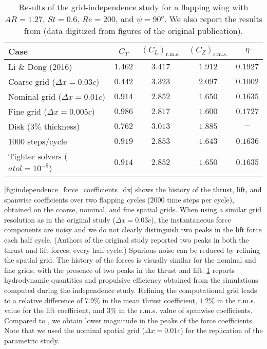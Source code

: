 \begin{table}[!h]
  \centering
  \begin{tabular}{lcccc}
    \hline\hline
    Case & $\overline{C_T}$ & $\left( C_L \right)_\text{r.m.s.}$ & $\left( C_Z \right)_\text{r.m.s.}$ & $\eta$ \\
    \hline
    Li \& Dong (2016) & $1.462$ & $3.417$ & $1.912$ & $0.1927$ \\
    Coarse grid ($\Delta x = 0.03c$) & $0.442$ & $3.323$ & $2.097$ & $0.1002$ \\
    Nominal grid ($\Delta x = 0.01c$) & $0.914$ & $2.852$ & $1.650$ & $0.1635$ \\
    Fine grid ($\Delta x = 0.005c$) & $0.986$ & $2.817$ & $1.600$ & $0.1727$ \\
    Disk ($3\%$ thickness) & $0.762$ & $3.013$ & $1.885$ & $-$ \\
    $1000$ steps/cycle & $0.919$ & $2.853$ & $1.643$ & $0.1636$ \\
    Tighter solvers ($atol = 10^{-9}$) & $0.914$ & $2.852$ & $1.650$ & $0.1635$ \\
    \hline\hline
  \end{tabular}
  \caption{Results of the grid-independence study for a flapping wing with $AR = 1.27$, $St = 0.6$, $Re = 200$, and $\psi = 90^o$. We also report the results from \citet{li_dong_2016} (data digitized from figures of the original publication).}
  \label{tab:independence_results}
\end{table}

\cref{fig:independence_force_coefficients_dx} shows the history of the thrust, lift, and spanwise coefficients over two flapping cycles ($2000$ time steps per cycle), obtained on the coarse, nominal, and fine spatial grids.
When using a similar grid resolution as in the original study ($\Delta x = 0.03c$), the instantaneous force components are noisy and we do not clearly distinguish two peaks in the lift force each half cycle.
(Authors of the original study reported two peaks in both the thrust and lift forces, every half cycle.)
Spurious noise can be reduced by refining the spatial grid.
The history of the forces is visually similar for the nominal and fine grids, with the presence of two peaks in the thrust and lift.
\cref{tab:independence_results} reports hydrodynamic quantities and propulsive efficiency obtained from the simulations computed during the independence study.
Refining the computational grid leads to a relative difference of $7.9\%$ in the mean thrust coefficient, $1.2\%$ in the r.m.s. value for the lift coefficient, and $3\%$ in the r.m.s. value of spanwise coefficients.
Compared to \citet{li_dong_2016}, we obtain lower magnitude in the peaks of the force coefficients.
Note that we used the nominal spatial grid ($\Delta x = 0.01c$) for the replication of the parametric study.

